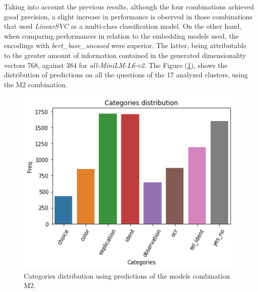 Taking into account the previous results, although the four combinations achieved good precision, a slight increase in performance is observed in those combinations that used \emph{LinearSVC} as a multi-class classification model. On the other hand, when comparing performances in relation to the embedding models used, the encodings with \emph{bert\_base\_uncased} were superior. The latter, being attributable to the greater amount of information contained in the generated dimensionality vectors $768$, against $384$ for \emph{all-MiniLM-L6-v2}. The Figure (\ref{fig:dist_m2}), shows the distribution of predictions on all the questions of the 17 analyzed clusters, using the M2 combination.


\begin{figure}[ht!]
    \centering
    \includegraphics[width=.9\linewidth]{images/training/distribution_m2_v2.pdf}
\caption{Categories distribution using predictions of the models combination M2.}
\label{fig:dist_m2}
\end{figure}